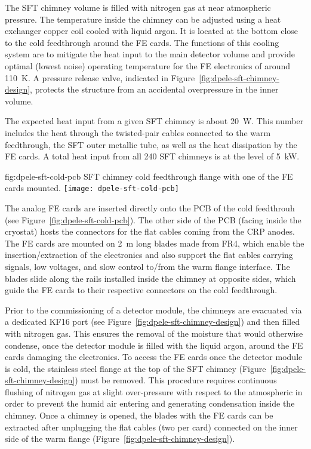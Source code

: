 The SFT chimney volume is filled with nitrogen gas at near atmospheric pressure. The temperature inside the chimney can be adjusted using a heat exchanger copper coil cooled with liquid argon. It is located at the bottom close to the cold feedthrough around the FE cards. The functions of this cooling system are to mitigate the heat input to the main detector volume and provide optimal (lowest noise) operating temperature for the FE electronics of around \SI{110}{K}. A pressure release valve, indicated in Figure~\ref{fig:dpele-sft-chimney-design}, protects the structure from an accidental overpressure in the inner volume. 

The expected heat input from a given SFT chimney is about \SI{20}{\watt}. This number includes the heat through the twisted-pair cables connected to the warm feedthrough, the SFT outer metallic tube, as well as the heat dissipation by the FE cards. A total heat input from all \num{240} SFT chimneys is at the level of \SI{5}{\kilo\watt}. 

\begin{dunefigure}{fig:dpele-sft-cold-pcb}
{SFT chimney cold feedthrough flange with one of the FE cards mounted.}
\texttt{[image: dpele-sft-cold-pcb]}
\end{dunefigure}

The analog FE cards are inserted directly onto the PCB of the cold feedthrouh (see Figure~\ref{fig:dpele-sft-cold-pcb}). The other side of the PCB (facing inside the cryostat) hosts the connectors for the flat cables coming from the CRP anodes.  The FE cards are mounted on \SI{2}{m} long blades made from FR4, which enable the insertion/extraction of the electronics and also support the flat cables carrying signals, low voltages, and slow control to/from the warm flange interface.  The blades slide along the rails installed inside the chimney at opposite sides, which guide the FE cards to their respective connectors on the cold feedthrough. 

Prior to the commissioning of a detector module, the chimneys are evacuated via a dedicated KF16 port (see Figure~\ref{fig:dpele-sft-chimney-design}) and then filled with nitrogen gas. This ensures the removal of the moisture that would otherwise condense, once the detector module is filled with the liquid argon, around the FE cards damaging the electronics. To access the FE cards once the detector module is cold, the stainless steel flange at the top of the SFT chimney (Figure~\ref{fig:dpele-sft-chimney-design}) must be removed. This procedure requires continuous flushing of nitrogen gas at slight over-pressure with respect to the atmospheric in order to prevent the humid air entering and generating condensation inside the chimney. Once a chimney is opened, the blades with the FE cards can be extracted after unplugging the flat cables (two per card) connected on the inner side of the warm flange (Figure~\ref{fig:dpele-sft-chimney-design}).

